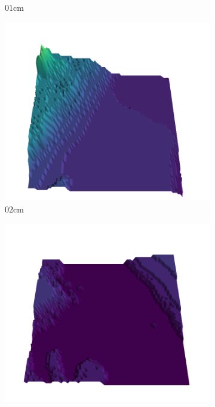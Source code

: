 \documentclass[../document.tex]{subfiles}
\begin{document}
\begin{figure}[htbp]
\begin{subfigure}[b]{0.19\textwidth}
        \caption{$01$cm}
        \end{subfigure}
        \begin{subfigure}[b]{0.19\textwidth}
        \includegraphics[width=\linewidth]{../img/5/quarry/all/worst/02-patch-3d-majavi-colormap-4.png}
        \caption{$02$cm}
        \end{subfigure}
        \begin{subfigure}[b]{0.19\textwidth}
        \includegraphics[width=\linewidth]{../img/5/quarry/all/worst/03-patch-3d-majavi-colormap-5.png}

\end{subfigure}
\end{figure}
\end{document}
